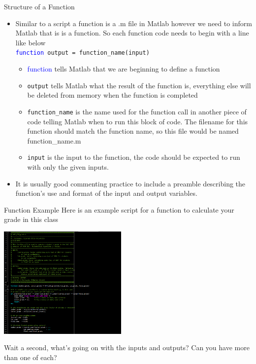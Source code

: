 {}\documentclass[letterpaper,
compress,
xcolor=x11names,
]{beamer}
\begin{document}
\begin{frame}{Structure of a Function}
	\footnotesize
	\begin{itemize}
		\item Similar to a script a function is a .m file in Matlab however we need to inform Matlab that is is a function. So each function code needs to begin with a line like below\\
		\texttt{\textcolor{blue}{function} output = function\_name(input)}
		\begin{itemize}
			\item \textcolor{blue}{function} tells Matlab that we are beginning to define a function
			\item \texttt{output} tells Matlab what the result of the function is, everything else will be deleted from memory when the function is completed
			\item \texttt{function\_name} is the name used for the function call in another piece of code telling Matlab when to run this block of code. The filename for this function should match the function name, so this file would be named function\_name.m
			\item \texttt{input} is the input to the function, the code should be expected to run with only the given inputs.
		\end{itemize}
		\item It is usually good commenting practice to include a preamble describing the function's use and format of the input and output variables.
	\end{itemize}
\end{frame}

\begin{frame}{Function Example}
	Here is an example script for a function to calculate your grade in this class
	\begin{center}
		\includegraphics[height = 5.5cm]{function_example.png}
	\end{center}
	Wait a second, what's going on with the inputs and outputs? Can you have more than one of each?
\end{frame}
\end{document}

